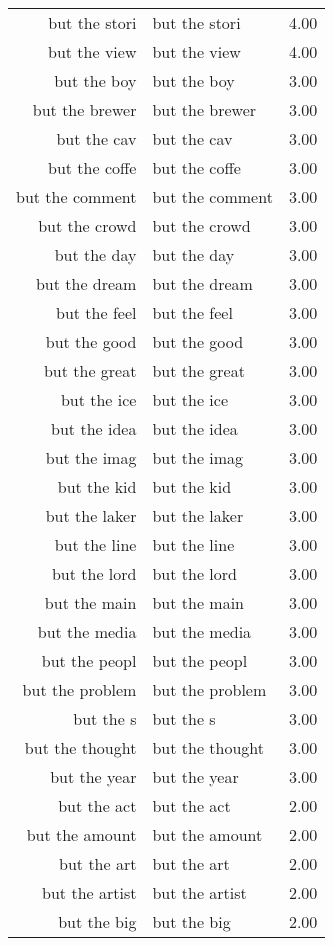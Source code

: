 \begin{table}[ht]
\begin{tabular}{rlr}
  but the stori & but the stori & 4.00 \\ 
  but the view & but the view & 4.00 \\ 
  but the boy & but the boy & 3.00 \\ 
  but the brewer & but the brewer & 3.00 \\ 
  but the cav & but the cav & 3.00 \\ 
  but the coffe & but the coffe & 3.00 \\ 
  but the comment & but the comment & 3.00 \\ 
  but the crowd & but the crowd & 3.00 \\ 
  but the day & but the day & 3.00 \\ 
  but the dream & but the dream & 3.00 \\ 
  but the feel & but the feel & 3.00 \\ 
  but the good & but the good & 3.00 \\ 
  but the great & but the great & 3.00 \\ 
  but the ice & but the ice & 3.00 \\ 
  but the idea & but the idea & 3.00 \\ 
  but the imag & but the imag & 3.00 \\ 
  but the kid & but the kid & 3.00 \\ 
  but the laker & but the laker & 3.00 \\ 
  but the line & but the line & 3.00 \\ 
  but the lord & but the lord & 3.00 \\ 
  but the main & but the main & 3.00 \\ 
  but the media & but the media & 3.00 \\ 
  but the peopl & but the peopl & 3.00 \\ 
  but the problem & but the problem & 3.00 \\ 
  but the s & but the s & 3.00 \\ 
  but the thought & but the thought & 3.00 \\ 
  but the year & but the year & 3.00 \\ 
  but the act & but the act & 2.00 \\ 
  but the amount & but the amount & 2.00 \\ 
  but the art & but the art & 2.00 \\ 
  but the artist & but the artist & 2.00 \\ 
  but the big & but the big & 2.00 \\ 

\end{tabular}
\end{table}
